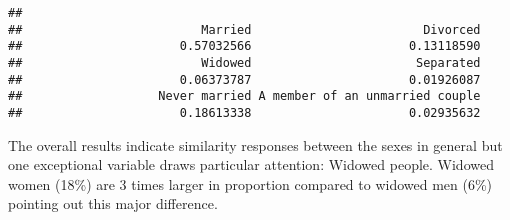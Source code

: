 \documentclass[]{article}
\newenvironment{Shaded}{\begin{snugshade}}{\end{snugshade}}
\newcommand{\KeywordTok}[1]{\textcolor[rgb]{0.13,0.29,0.53}{\textbf{#1}}}
\newcommand{\NormalTok}[1]{#1}
\newcommand{\OperatorTok}[1]{\textcolor[rgb]{0.81,0.36,0.00}{\textbf{#1}}}
\begin{document}
\begin{Shaded}
\end{Shaded}

\begin{verbatim}
## 
##                         Married                        Divorced 
##                      0.57032566                      0.13118590 
##                         Widowed                       Separated 
##                      0.06373787                      0.01926087 
##                   Never married A member of an unmarried couple 
##                      0.18613338                      0.02935632
\end{verbatim}

The overall results indicate similarity responses between the sexes in
general but one exceptional variable draws particular attention: Widowed
people. Widowed women (18\%) are 3 times larger in proportion compared
to widowed men (6\%) pointing out this major difference.
\end{document}
